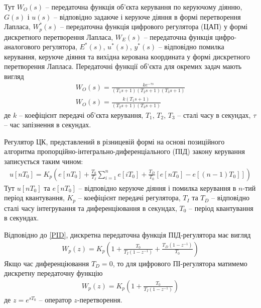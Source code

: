 Тут $W_O(s)$ -- передаточна функція об'єкта керування по керуючому діянню, $G(s)$ і $u(s)$ -- відповідно задаюче і керуюче діяння в формі
перетворення Лапласа, $W_p^*(s)$ -- передаточна функція цифрового регулятора (ЦАП) у формі дискретного перетворення Лапласа,
$W_E(s)$ -- передаточна функція цифро-аналогового регулятора, $E^*(s)$, $u^*(s)$, $y^*(s)$ -- відповідно помилка керування,
керуюче діяння та вихідна керована координата у формі дискретного перетворення Лапласа. Передаточні функції об'єкта для окремих задач мають вигляд
\begin{gather}\label{W_0}
    W_O(s) = \frac{
        k e^{-\tau s}
    }{
        (T_1 s + 1) (T_2 s + 1) (T_3 s + 1)
    } \\
    \label{W_0_12}
    W_O(s) = \frac{
        k (T_1 s + 1)
    }{
        (T_2 s + 1) (T_3 s + 1)
    }
\end{gather}
де $k$ -- коефіцієнт передачі об'єкта керування, $T_1$, $T_2$, $T_3$ -- сталі часу в секундах, $\tau$ -- час запізнення в секундах.

Регулятор ЦК, представлений в різницевій формі на основі позиційного алгоритма пропорційно-інтегрально-диференціального (ПІД)
закону керування записується таким чином:
\begin{gather}\label{PID}
    u[n T_0] = K_p \left(
        e[n T_0] + \frac{T_0}{T_I} \sum_{i=1}^n e[i T_0] +
        \frac{T_D}{T_0} \left[e[n T_0] - e[(n-1)T_0]\right]
    \right)
\end{gather}
Тут $u[n T_0]$ та $e[n T_0]$ -- відповідно керуюче діяння і помилка керування в $n$-тий період квантування,
$K_p$ -- коефіцієнт передачі регулятора, $T_I$ та $T_D$ -- відповідно сталі часу інтегрування та диференціювання в секундах,
$T_0$ -- період квантування в секундах. 

Відповідно до \eqref{PID}, дискретна передаточна функція ПІД-регулятора має вигляд
\begin{gather}
    W_p(z) = K_p \left(
        1 + \frac{T_0}{T_I \left(1 - z^{-1}\right)} + \frac{T_D\left(1 - z^{-1}\right)}{T_0}
    \right)
\end{gather}
Якщо час диференціювання $T_D = 0$, то для цифрового ПІ-регулятора матимемо дискретну передаточну функцію
\begin{gather}\label{PI}
    W_p(z) = K_p \left(
        1 + \frac{T_0}{T_I \left(1 - z^{-1}\right)}
    \right)
\end{gather}
де $z = e^{sT_0}$ -- оператор $z$-перетворення.


